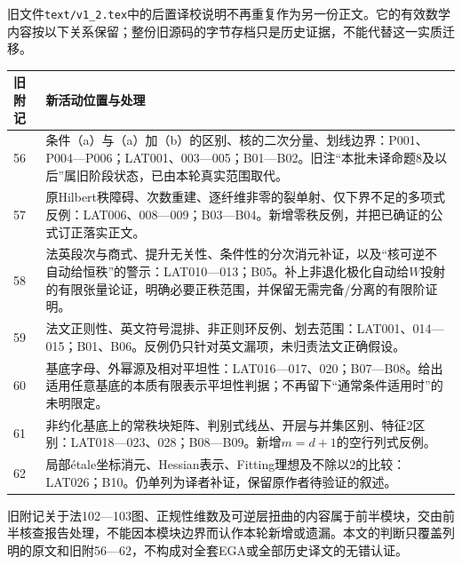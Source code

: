 旧文件\texttt{text/v1\_2.tex}中的后置译校说明不再重复作为另一份正文。它的有效数学内容按以下关系保留；整份旧源码的字节存档只是历史证据，不能代替这一实质迁移。
\begin{longtable}{p{}p{}}
\toprule
旧附记 & 新活动位置与处理\\
\midrule
\endhead
56 & 条件（a）与（a）加（b）的区别、核的二次分量、划线边界：P001、P004—P006；LAT001、003—005；B01—B02。旧注“本批未译命题8及以后”属旧阶段状态，已由本轮真实范围取代。\\
57 & 原Hilbert秩障碍、次数重建、逐纤维非零的裂单射、仅下界不足的多项式反例：LAT006、008—009；B03—B04。新增零秩反例，并把已确证的公式订正落实正文。\\
58 & 法英段次与商式、提升无关性、条件性的分次消元补证，以及“核可逆不自动给恒秩”的警示：LAT010—013；B05。补上非退化极化自动给$W$投射的有限张量论证，明确必要正秩范围，并保留无需完备/分离的有限阶证明。\\
59 & 法文正则性、英文符号混排、非正则环反例、划去范围：LAT001、014—015；B01、B06。反例仍只针对英文漏项，未归责法文正确假设。\\
60 & 基底字母、外幂源及相对平坦性：LAT016—017、020；B07—B08。给出适用任意基底的本质有限表示平坦性判据；不再留下“通常条件适用时”的未明限定。\\
61 & 非约化基底上的常秩块矩阵、判别式线丛、开层与并集区别、特征$2$区别：LAT018—023、028；B08—B09。新增$m=d+1$的空行列式反例。\\
62 & 局部étale坐标消元、Hessian表示、Fitting理想及不除以$2$的比较：LAT026；B10。仍单列为译者补证，保留原作者待验证的叙述。\\
\bottomrule
\end{longtable}
旧附记关于法102—103图、正规性维数及可逆层扭曲的内容属于前半模块，交由前半核查报告处理，不能因本模块边界而认作本轮新增或遗漏。本文的判断只覆盖列明的原文和旧附56—62，不构成对全套EGA或全部历史译文的无错认证。
\endgroup

